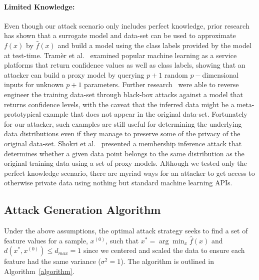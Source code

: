 \documentclass[runningheads]{llncs}
\begin{document}
\paragraph{Limited Knowledge: }
Even though our attack scenario only includes perfect knowledge, prior research~\cite{fredrikson2015model,biggio2013evasion,chakraborty2018adversarial,wang2019security,ateniese2015hacking} has shown that a surrogate model and data-set can be used to approximate $f(x)$ by $\hat{f}(x)$ and build a model using the class labels provided by the model at test-time. Tram\`er et al.~\cite{tramer2016stealing} examined popular machine learning as a service platforms that return confidence values as well as class labels, showing that an attacker can build a proxy model by querying $ p + 1$ random $p-$dimensional inputs for unknown $p+1$ parameters. Further research~\cite{fredrikson2015model} were able to reverse engineer the training data-set through black-box attacks against a model that returns confidence levels, with the caveat that the inferred data might be a meta-prototypical example that does not appear in the original data-set. Fortunately for our attacker, such examples are still useful for determining the underlying data distributions even if they manage to preserve some of the privacy of the original data-set. Shokri et al.~\cite{shokri2017membership} presented a membership inference attack that determines whether a given data point belongs to the same distribution as the original training data using a set of proxy models. Although we tested only the perfect knowledge scenario, there are myriad ways for an attacker to get access to otherwise private data using nothing but standard machine learning APIs. 


\subsection{Attack Generation Algorithm}

Under the above assumptions, the optimal attack strategy seeks to find a set of feature values for a sample, $x^{(0)}$, such that
$x^* = \arg\min_{x}\hat{f}(x)$ and $d(x^*, x^{(0)}) \leq d_{max} = 1$ since we centered and scaled the data to ensure each feature had the same variance ($\sigma^2 = 1$).  The algorithm is outlined in Algorithm~\ref{algorithm}.
\end{document}

